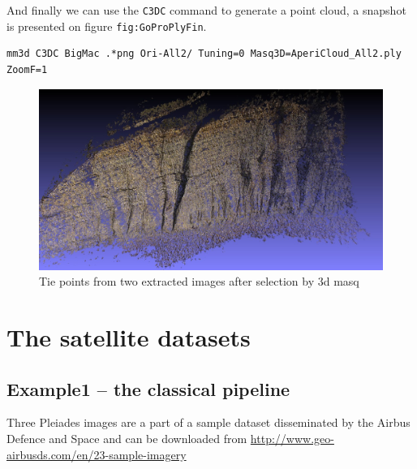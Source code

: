 And finally we can use the {\tt C3DC} command to generate a point cloud, a snapshot is presented on figure {\tt fig:GoProPlyFin}.

\begin{verbatim}
mm3d C3DC BigMac .*png Ori-All2/ Tuning=0 Masq3D=AperiCloud_All2.ply ZoomF=1
\end{verbatim}

\begin{figure}
\centering
\includegraphics[width=0.90\linewidth]{FIGS/GoProVideo/PLY-Climb00.jpg}
\caption{Tie points from  two extracted images after selection by $3$d masq}
\label{fig:GoProPlyFin}
\end{figure}

\newpage 
\section{The satellite datasets}\label{sec:usecase:satel}
%
\subsection{Example1 -- the classical pipeline }
%
%
Three Pleiades images are a part of a sample dataset disseminated by the Airbus Defence and Space and can be downloaded from \url{http://www.geo-airbusds.com/en/23-sample-imagery} 
